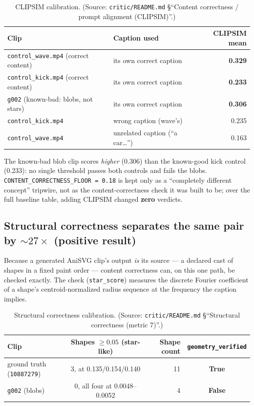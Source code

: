 \documentclass[11pt]{article}
\newcommand{\secsym}{\S}
\begin{document}
\begin{table}[h]
\centering
\caption{CLIPSIM calibration. (Source: \texttt{critic/README.md}
\secsym``Content correctness / prompt alignment (CLIPSIM)''.)}
\label{tab:clipsim}
\begin{tabular}{@{}L{5.5cm}L{3.5cm}r@{}}
\toprule
Clip & Caption used & CLIPSIM mean \\
\midrule
\texttt{control\_wave.mp4} (correct content) & its own correct caption & \textbf{0.329} \\
\texttt{control\_kick.mp4} (correct content) & its own correct caption & \textbf{0.233} \\
\texttt{g002} (known-bad: blobs, not stars) & its own correct caption & \textbf{0.306} \\
\texttt{control\_kick.mp4} & wrong caption (wave's) & 0.235 \\
\texttt{control\_wave.mp4} & unrelated caption (``a car\ldots'') & 0.163 \\
\bottomrule
\end{tabular}
\end{table}

The known-bad blob clip scores \emph{higher} (0.306) than the known-good
kick control (0.233): no single threshold passes both controls and fails
the blobs. \texttt{CONTENT\_CORRECTNESS\_FLOOR = 0.18} is kept only as a
``completely different concept'' tripwire, not as the content-correctness
check it was built to be; over the full baseline table, adding CLIPSIM
changed \textbf{zero} verdicts.

\subsection{Structural correctness separates the same pair by \texorpdfstring{$\sim27\times$}{~27x} (positive result)}
\label{sec:structural}

Because a generated AniSVG clip's output \emph{is} its source --- a
declared cast of shapes in a fixed paint order --- content correctness can,
on this one path, be checked exactly. The check (\texttt{star\_score})
measures the discrete Fourier coefficient of a shape's
centroid-normalized radius sequence at the frequency the caption implies.

\begin{table}[h]
\centering
\caption{Structural correctness calibration. (Source: \texttt{critic/README.md}
\secsym``Structural correctness (metric 7)''.)}
\label{tab:structural}
\begin{tabular}{@{}L{4.5cm}crc@{}}
\toprule
Clip & Shapes $\geq0.05$ (star-like) & Shape count & \texttt{geometry\_verified} \\
\midrule
ground truth (\texttt{10887279}) & 3, at 0.135/0.154/0.140 & 11 & \textbf{True} \\
\texttt{g002} (blobs) & 0, all four at 0.0048--0.0052 & 4 & \textbf{False} \\
\bottomrule
\end{tabular}
\end{table}
\end{document}
